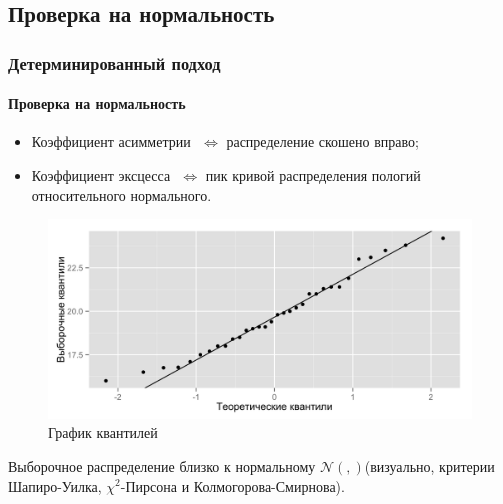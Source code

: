 \documentclass{beamer}
\newcommand{\inp}[1]{}
\newcommand{\descriptive}[2]{\inp{#1/descriptive/#2}}
\newcommand{\normaldistr}{$\mathcal{N}(\descriptive{original}{mean}, \descriptive{original}{variance})$}
\begin{document}
\subsection{Проверка на нормальность}
\begin{frame}
  \frametitle{Детерминированный подход}
  \framesubtitle{Проверка на нормальность}
  \begin{multicols}{2}
  \begin{itemize}
    \item Коэффициент асимметрии $ \descriptive{original}{skew} $ $ \Leftrightarrow $ распределение скошено вправо;
    \item Коэффициент эксцесса $ \descriptive{original}{kurtosis} $ $ \Leftrightarrow $ пик кривой распределения пологий относительного нормального.
  \end{itemize}
  
  \columnbreak
  \begin{figure}[h]
    \includegraphics[width=1\linewidth]{../../figures/original/quantile.png}
    \caption{График квантилей}
  \end{figure}
  \end{multicols}
  
  Выборочное распределение близко к нормальному \normaldistr (визуально, критерии Шапиро-Уилка, $\chi^2$-Пирсона и Колмогорова-Смирнова).
\end{frame}
\end{document}
